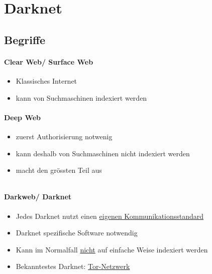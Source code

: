 \section{Darknet}

\subsection{Begriffe}
\begin{minipage}{0.6\linewidth}
    \paragraph{Clear Web/ Surface Web}
    \begin{itemize}
        \item Klassisches Internet
        \item kann von Suchmaschinen indexiert werden
    \end{itemize}
    \paragraph{Deep Web}
    \begin{itemize}
        \item zuerst Authorisierung notwenig
        \item kann deshalb von Suchmaschinen nicht indexiert werden
        \item macht den grössten Teil aus
    \end{itemize}
    \vfill
    $ $
\end{minipage}
\begin{minipage}{0.4\linewidth}
    \paragraph{Darkweb/ Darknet}
    \begin{itemize}
        \item Jedes Darknet nutzt einen \underline{eigenen Kommunikationsstandard}
        \item Darknet spezifische Software notwendig
        \item Kann im Normalfall \underline{nicht} auf einfache Weise indexiert werden
        \item Bekanntestes Darknet: \underline{Tor-Netzwerk}
    \end{itemize}
\end{minipage}

